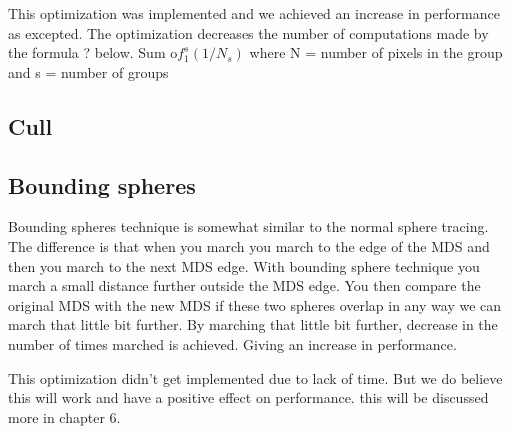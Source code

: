 			This optimization was implemented and we achieved an increase in
			performance as excepted. The optimization decreases the number of
			computations made by the formula ? below.  Sum o$f_1^s(1/N_s)$
			where N = number of pixels in the group and s = number of groups
		
		
		\subsection{Cull}
		
		\subsection{Bounding spheres}
	
			Bounding spheres technique is somewhat similar to the normal sphere
			tracing. The difference is that when you march you march to the
			edge of the MDS and then you march to the next MDS edge. With
			bounding sphere technique you march a small distance further
			outside the MDS edge. You then compare the original MDS with the
			new MDS if these two spheres overlap in any way we can march that
			little bit further. By marching that little bit further, decrease
			in the number of times marched is achieved. Giving an increase in
			performance. 
			
			This optimization didn't get implemented due to lack of time. But
			we do believe this will work and have a positive effect on
			performance. this will be discussed more in chapter 6.
		

